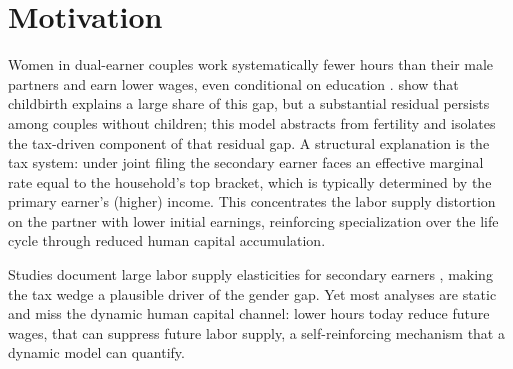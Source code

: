 \section{Motivation}
\vspace{-1em}
Women in dual-earner couples work systematically fewer hours than their male partners and earn lower wages, even conditional on education \citep{blau2017gender}.
\citet{kleven2019children} show that childbirth explains a large share of this gap, but a substantial residual persists among couples without children; this model abstracts from fertility and isolates the tax-driven component of that residual gap.
A structural explanation is the tax system: under joint filing the secondary earner faces an effective marginal rate equal to the household's top bracket, which is typically determined by the primary earner's (higher) income.
This concentrates the labor supply distortion on the partner with lower initial earnings, reinforcing specialization over the life cycle through reduced human capital accumulation.

\noindent Studies document large labor supply elasticities for secondary earners \citep{bick2017taxation}, making the tax wedge a plausible driver of the gender gap.
Yet most analyses are static and miss the dynamic human capital channel: lower hours today reduce future wages, that can suppress future labor supply, a self-reinforcing mechanism that a dynamic model can quantify.
